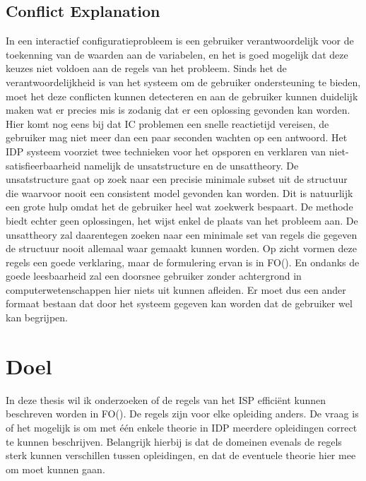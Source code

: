 \subsection{Conflict Explanation}
In een interactief configuratieprobleem is een gebruiker verantwoordelijk voor de toekenning van de waarden aan de variabelen, en het is goed mogelijk dat deze keuzes niet voldoen aan de regels van het probleem. Sinds het de verantwoordelijkheid is van het systeem om de gebruiker ondersteuning te bieden, moet het deze conflicten kunnen detecteren en aan de gebruiker kunnen duidelijk maken wat er precies mis is zodanig dat er een oplossing gevonden kan worden. Hier komt nog eens bij dat IC problemen een snelle reactietijd vereisen, de gebruiker mag niet meer dan een paar seconden wachten op een antwoord. Het IDP systeem voorziet twee technieken voor het opsporen en verklaren van niet-satisfieerbaarheid namelijk de unsatstructure en de unsattheory. De unsatstructure gaat op zoek naar een precisie minimale subset uit de structuur die waarvoor nooit een consistent model gevonden kan worden. Dit is natuurlijk een grote hulp omdat het de gebruiker heel wat zoekwerk bespaart. De methode biedt echter geen oplossingen, het wijst enkel de plaats van het probleem aan. De unsattheory zal daarentegen zoeken naar een minimale set van regels die gegeven de structuur nooit allemaal waar gemaakt kunnen worden. Op zicht vormen deze regels een goede verklaring, maar de formulering ervan is in FO(\textperiodcentered). En ondanks de goede leesbaarheid zal een doorsnee gebruiker zonder achtergrond in computerwetenschappen hier niets uit kunnen afleiden. Er moet dus een ander formaat bestaan dat door het systeem gegeven kan worden dat de gebruiker wel kan begrijpen.

\section{Doel}
In deze thesis wil ik onderzoeken of de regels van het ISP effici\"{e}nt kunnen beschreven worden in FO(\textperiodcentered). De regels zijn voor elke opleiding anders. De vraag is of het mogelijk is om met \'{e}\'{e}n enkele theorie in IDP meerdere opleidingen correct te kunnen beschrijven. Belangrijk hierbij is dat de domeinen evenals de regels sterk kunnen verschillen tussen opleidingen, en dat de eventuele theorie hier mee om moet kunnen gaan. 

